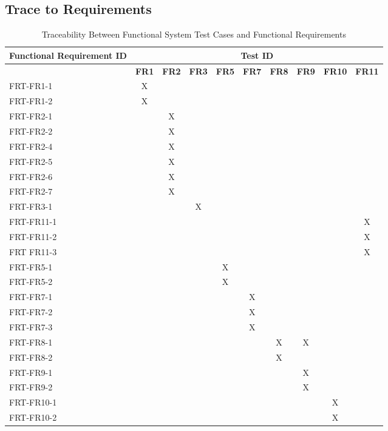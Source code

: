 \documentclass[12pt, titlepage]{article}
\begin{document}
\newpage
\begin{landscape}
\section{Trace to Requirements}
  \begin{longtable}{|l|ccccccccc|}
    \caption{Traceability Between Functional System Test Cases and Functional Requirements} \\
    \hline
    \textbf{Functional Requirement ID}   & \multicolumn{9}{c|}{\textbf{Test ID}} \\
    \hline
    ~ & \textbf{FR1} & \textbf{FR2} & \textbf{FR3} & \textbf{FR5} & \textbf{FR7} & \textbf{FR8} & \textbf{FR9} & \textbf{FR10} & \textbf{FR11} \\
    \hline
    FRT-FR1-1 & X & ~ & ~ & ~ & ~ & ~ & ~ & ~ & ~ \\
    FRT-FR1-2 & X & ~ & ~ & ~ & ~ & ~ & ~ & ~ & ~ \\
    FRT-FR2-1 & ~ & X & ~ & ~ & ~ & ~ & ~ & ~ & ~ \\
    FRT-FR2-2 & ~ & X & ~ & ~ & ~ & ~ & ~ & ~ & ~ \\
    FRT-FR2-4 & ~ & X & ~ & ~ & ~ & ~ & ~ & ~ & ~ \\
    FRT-FR2-5 & ~ & X & ~ & ~ & ~ & ~ & ~ & ~ & ~ \\
    FRT-FR2-6 & ~ & X & ~ & ~ & ~ & ~ & ~ & ~ & ~ \\
    FRT-FR2-7 & ~ & X & ~ & ~ & ~ & ~ & ~ & ~ & ~ \\
    FRT-FR3-1 & ~ & ~ & X & ~ & ~ & ~ & ~ & ~ & ~ \\
    FRT-FR11-1 & ~ & ~ & ~ & ~ & ~ & ~ & ~ & ~ & X \\
    FRT-FR11-2 & ~ & ~ & ~ & ~ & ~ & ~ & ~ & ~ & X \\
    FRT FR11-3 & ~ & ~ & ~ & ~ & ~ & ~ & ~ & ~ & X \\
    FRT-FR5-1 & ~ & ~ & ~ & X & ~ & ~ & ~ & ~ & ~ \\
    FRT-FR5-2 & ~ & ~ & ~ & X & ~ & ~ & ~ & ~ & ~ \\
    FRT-FR7-1 & ~ & ~ & ~ & ~ & X & ~ & ~ & ~ & ~ \\
    FRT-FR7-2 & ~ & ~ & ~ & ~ & X & ~ & ~ & ~ & ~ \\
    FRT-FR7-3 & ~ & ~ & ~ & ~ & X & ~ & ~ & ~ & ~ \\
    FRT-FR8-1 & ~ & ~ & ~ & ~ & ~ & X & X & ~ & ~ \\
    FRT-FR8-2 & ~ & ~ & ~ & ~ & ~ & X & ~ & ~ & ~ \\
    FRT-FR9-1 & ~ & ~ & ~ & ~ & ~ & ~ & X & ~ & ~ \\
    FRT-FR9-2 & ~ & ~ & ~ & ~ & ~ & ~ & X & ~ & ~ \\
    FRT-FR10-1 & ~ & ~ & ~ & ~ & ~ & ~ & ~ & X & ~ \\
    FRT-FR10-2 & ~ & ~ & ~ & ~ & ~ & ~ & ~ & X & ~ \\
    \hline
  \end{longtable}


\end{landscape}
\end{document}
